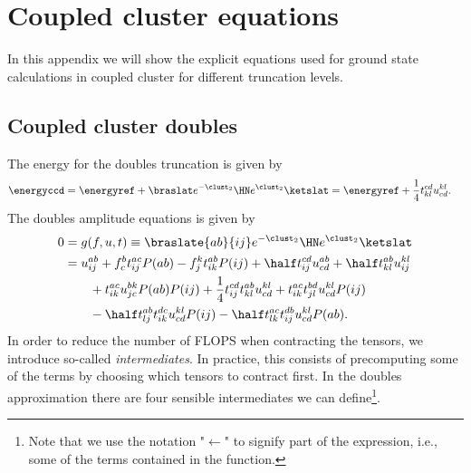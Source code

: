 \chapter{Coupled cluster equations}
    In this appendix we will show the explicit equations used for ground state
    calculations in coupled cluster for different truncation levels.

    \section{Coupled cluster doubles}
        The energy for the doubles truncation is given by
        \begin{align}
            \energyccd
            &= \energyref
            + \braslat e^{-\clust_2}\HN e^{\clust_2}\ketslat
            = \energyref
            + \frac{1}{4}t^{cd}_{kl} u^{kl}_{cd}.
        \end{align}
        The doubles amplitude equations is given by\cite{shavitt2009many}
        \begin{align}
            0 &= g(f, u, t)
            \equiv \braslate{ab}{ij}e^{-\clust_2}\HN e^{\clust_2}\ketslat
            \\
            &=
            u^{ab}_{ij}
            + f^{b}_{c} t^{ac}_{ij} P(ab)
            - f^{k}_{j} t^{ab}_{ik} P(ij)
            + \half t^{cd}_{ij} u^{ab}_{cd}
            + \half t^{ab}_{kl} u^{kl}_{ij}
            \nonumber \\
            &\qquad
            + t^{ac}_{ik} u^{bk}_{jc} P(ab) P(ij)
            + \frac{1}{4} t^{cd}_{ij} t^{ab}_{kl} u^{kl}_{cd}
            + t^{ac}_{ik} t^{bd}_{jl} u^{kl}_{cd} P(ij)
            \nonumber \\
            &\qquad
            - \half t^{ab}_{lj} t^{dc}_{ik} u^{kl}_{cd} P(ij)
            - \half t^{ac}_{lk} t^{db}_{ij} u^{kl}_{cd} P(ab).
        \end{align}
        In order to reduce the number of FLOPS when contracting the tensors, we
        introduce so-called \emph{intermediates}\cite{hjorth2017advanced}. In
        practice, this consists of precomputing some of the terms by choosing
        which tensors to contract first. In the doubles approximation there are
        four sensible intermediates we can define\footnote{Note that we use the
        notation "$\gets$" to signify part of the expression, i.e., some of the
        terms contained in the function.}.
